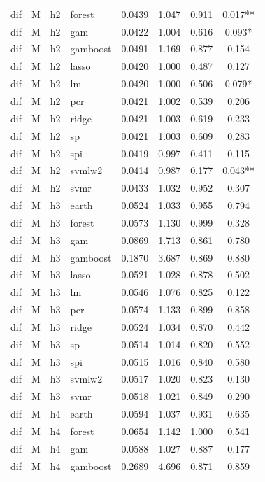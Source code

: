 \begin{ThreePartTable}
\begin{longtable}[t]{llclcccc}
dif & M & h2 & forest & 0.0439 & 1.047 & 0.911 & 0.017**\\
dif & M & h2 & gam & 0.0422 & 1.004 & 0.616 & 0.093*\\
dif & M & h2 & gamboost & 0.0491 & 1.169 & 0.877 & 0.154\\
dif & M & h2 & lasso & 0.0420 & 1.000 & 0.487 & 0.127\\
dif & M & h2 & lm & 0.0420 & 1.000 & 0.506 & 0.079*\\
dif & M & h2 & pcr & 0.0421 & 1.002 & 0.539 & 0.206\\
dif & M & h2 & ridge & 0.0421 & 1.003 & 0.619 & 0.233\\
dif & M & h2 & sp & 0.0421 & 1.003 & 0.609 & 0.283\\
dif & M & h2 & spi & 0.0419 & 0.997 & 0.411 & 0.115\\
dif & M & h2 & svmlw2 & 0.0414 & 0.987 & 0.177 & 0.043**\\
dif & M & h2 & svmr & 0.0433 & 1.032 & 0.952 & 0.307\\
\addlinespace
dif & M & h3 & earth & 0.0524 & 1.033 & 0.955 & 0.794\\
dif & M & h3 & forest & 0.0573 & 1.130 & 0.999 & 0.328\\
dif & M & h3 & gam & 0.0869 & 1.713 & 0.861 & 0.780\\
dif & M & h3 & gamboost & 0.1870 & 3.687 & 0.869 & 0.880\\
dif & M & h3 & lasso & 0.0521 & 1.028 & 0.878 & 0.502\\
dif & M & h3 & lm & 0.0546 & 1.076 & 0.825 & 0.122\\
dif & M & h3 & pcr & 0.0574 & 1.133 & 0.899 & 0.858\\
dif & M & h3 & ridge & 0.0524 & 1.034 & 0.870 & 0.442\\
dif & M & h3 & sp & 0.0514 & 1.014 & 0.820 & 0.552\\
dif & M & h3 & spi & 0.0515 & 1.016 & 0.840 & 0.580\\
dif & M & h3 & svmlw2 & 0.0517 & 1.020 & 0.823 & 0.130\\
dif & M & h3 & svmr & 0.0518 & 1.021 & 0.849 & 0.290\\
\addlinespace
dif & M & h4 & earth & 0.0594 & 1.037 & 0.931 & 0.635\\
dif & M & h4 & forest & 0.0654 & 1.142 & 1.000 & 0.541\\
dif & M & h4 & gam & 0.0588 & 1.027 & 0.887 & 0.177\\
dif & M & h4 & gamboost & 0.2689 & 4.696 & 0.871 & 0.859\\

\end{longtable}
\end{ThreePartTable}
